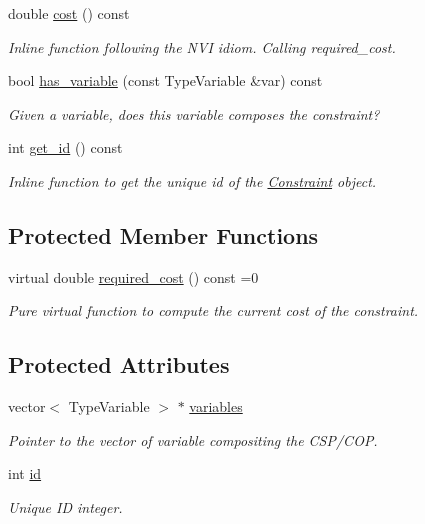 \begin{DoxyCompactItemize}
double \hyperlink{classghost_1_1Constraint_a17995c5c52621d159c155ee789dce62a}{cost} () const 
\begin{DoxyCompactList}\small\item\em Inline function following the N\-V\-I idiom. Calling required\-\_\-cost. \end{DoxyCompactList}\item 
bool \hyperlink{classghost_1_1Constraint_a11376d095cb76243f9b832ecd682ed1e}{has\-\_\-variable} (const Type\-Variable \&var) const 
\begin{DoxyCompactList}\small\item\em Given a variable, does this variable composes the constraint? \end{DoxyCompactList}\item 
int \hyperlink{classghost_1_1Constraint_a0740fbf918c274ed99b4b186e859b83d}{get\-\_\-id} () const 
\begin{DoxyCompactList}\small\item\em Inline function to get the unique id of the \hyperlink{classghost_1_1Constraint}{Constraint} object. \end{DoxyCompactList}\end{DoxyCompactItemize}
\subsection*{Protected Member Functions}
\begin{DoxyCompactItemize}
\item 
virtual double \hyperlink{classghost_1_1Constraint_a92cde60cfccb2e08f76cf7b70a2dd41c}{required\-\_\-cost} () const =0
\begin{DoxyCompactList}\small\item\em Pure virtual function to compute the current cost of the constraint. \end{DoxyCompactList}\end{DoxyCompactItemize}
\subsection*{Protected Attributes}
\begin{DoxyCompactItemize}
\item 
vector$<$ Type\-Variable $>$ $\ast$ \hyperlink{classghost_1_1Constraint_a83305933e19440f42428da0726261c4a}{variables}
\begin{DoxyCompactList}\small\item\em Pointer to the vector of variable compositing the C\-S\-P/\-C\-O\-P. \end{DoxyCompactList}\item 
int \hyperlink{classghost_1_1Constraint_afffa2a41da00f31eff2e1b69b25541dc}{id}
\begin{DoxyCompactList}\small\item\em Unique I\-D integer. \end{DoxyCompactList}\end{DoxyCompactItemize}
